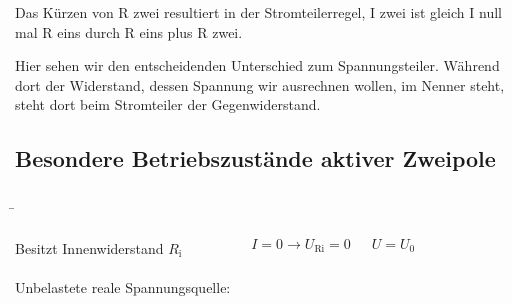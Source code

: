 \begin{frame}
{{			Das Kürzen von R zwei resultiert in der Stromteilerregel,  I zwei ist gleich I null mal R eins durch R eins plus R zwei. 
			
			Hier sehen wir den entscheidenden Unterschied zum Spannungsteiler. Während dort der Widerstand, dessen Spannung wir ausrechnen wollen, im Nenner steht, steht dort beim Stromteiler der
			Gegenwiderstand.
		}
		
	}
	
\end{frame}






\begin{frame}
	\subsection{Besondere Betriebszustände aktiver Zweipole}
	
	
	
	
	
	
	\b{
	
		\begin{columns}
			
			
			Besitzt Innenwiderstand $R_\mathrm{i}$\\
			
			\phantom{text}\\
			
			Unbelastete reale Spannungsquelle: 
			
			\begin{equation*}
				I = 0 \rightarrow U_\mathrm{Ri} = 0
			\end{equation*}
			
			\vspace*{-10pt}
			
			\begin{equation*}
				U = U_0
			\end{equation*}
			
\end{columns}}
\end{frame}
